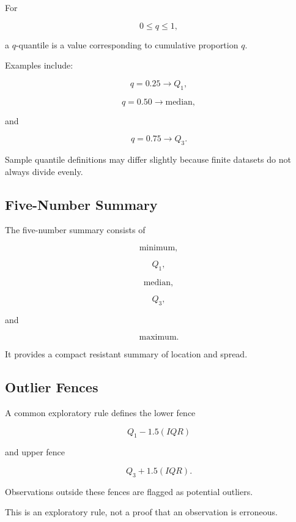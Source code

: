 For

\[
0\leq q\leq1,
\]

a \(q\)-quantile is a value corresponding to cumulative proportion \(q\).

Examples include:

\[
q=0.25
\longrightarrow
Q_1,
\]

\[
q=0.50
\longrightarrow
\text{median},
\]

and

\[
q=0.75
\longrightarrow
Q_3.
\]

Sample quantile definitions may differ slightly because finite datasets
do not always divide evenly.

\subsection{Five-Number Summary}
\label{subsec:five-number-summary}

The five-number summary consists of

\[
\boxed{
\text{minimum},
}
\]

\[
\boxed{
Q_1,
}
\]

\[
\boxed{
\text{median},
}
\]

\[
\boxed{
Q_3,
}
\]

and

\[
\boxed{
\text{maximum}.
}
\]

It provides a compact resistant summary of location and spread.

\subsection{Outlier Fences}
\label{subsec:outlier-fences}

A common exploratory rule defines the lower fence

\[
\boxed{
Q_1-1.5(IQR)
}
\]

and upper fence

\[
\boxed{
Q_3+1.5(IQR).
}
\]

Observations outside these fences are flagged as potential outliers.

This is an exploratory rule, not a proof that an observation is
erroneous.


